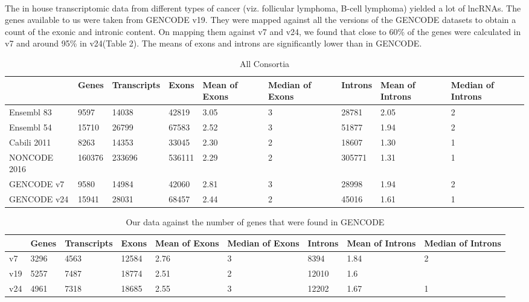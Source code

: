 \documentclass[ncrna,article,submit,moreauthors,pdftex,10pt,a4paper]{mdpi}
\begin{document}
 \paragraph{}
 The in house transcriptomic data from different types of cancer (viz. follicular lymphoma, B-cell lymphoma) yielded a lot of lncRNAs. 
 The genes available to us were taken from GENCODE v19.
 They were mapped against all the versions of the GENCODE datasets to obtain a count of the exonic and intronic content. 
  On mapping them against v7 and v24, we found that close to 60\% of the genes
 were calculated in v7 and around 95\% in v24(Table 2). The means of exons and introns are significantly lower than in GENCODE. 

\begin{table}[ht]
\caption{All Consortia} 
\centering
{\tiny
\begin{tabular}[lrrrrrrrr]{p{}|p{}p{}p{}p{}
p{}p{}p{}p{}}
  \hline
 & Genes & Transcripts & Exons & Mean of Exons & Median of Exons & Introns & Mean of Introns & Median of Introns \\ 
   \hline
Ensembl 83 & 9597 & 14038 & 42819 & 3.05 &   3 & 28781 & 2.05 &   2 \\ 
  Ensembl 54 & 15710 & 26799 & 67583 & 2.52 &   3 & 51877 & 1.94 &   2 \\ 
  Cabili 2011 & 8263 & 14353 & 33045 & 2.30 &   2 & 18607 & 1.30 &   1 \\ 
  NONCODE 2016 & 160376 & 233696 & 536111 & 2.29 &   2 & 305771 & 1.31 &   1 \\ 
  GENCODE v7 & 9580 & 14984 & 42060 & 2.81 &   3 & 28998 & 1.94 &   2 \\ 
  GENCODE v24 & 15941 & 28031 & 68457 & 2.44 &   2 & 45016 & 1.61 &   1 \\ 
   \hline
\end{tabular}
}
\end{table}%


\begin{table}[ht]
\centering
{\tiny
\begin{tabular}[lrrrrrrrr]{p{}|p{}p{}p{}p{}
p{}p{}p{}p{}}
  \hline
 & Genes & Transcripts & Exons & Mean of Exons & Median of Exons & Introns & Mean of Introns & Median of Introns \\ 
   \hline
v7 & 3296 & 4563 & 12584 & 2.76 & 3 & 8394 & 1.84 & 2\\
  v19 & 5257 & 7487 & 18774 & 2.51 & 2 & 12010 & 1.6\\
  v24 & 4961 & 7318 & 18685 & 2.55 & 3 & 12202 & 1.67 & 1\\ 
   \hline
\end{tabular}
}
\caption{Our data against the number of genes that were found in GENCODE} 
\end{table}%
\newpage
\end{document}

